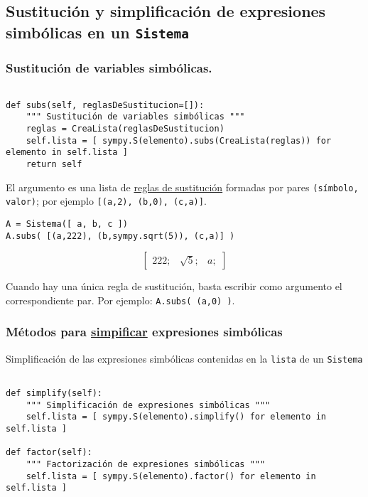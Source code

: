 \documentclass[11pt]{report}
\begin{document}
\subsection{Sustitución y simplificación de expresiones simbólicas en un \texttt{Sistema}}
\label{sec:orge5757f9}

\subsubsection{Sustitución de variables simbólicas.}
\label{sec:org74dfe5a}

\begin{verbatim}

def subs(self, reglasDeSustitucion=[]):
    """ Sustitución de variables simbólicas """
    reglas = CreaLista(reglasDeSustitucion)
    self.lista = [ sympy.S(elemento).subs(CreaLista(reglas)) for elemento in self.lista ]
    return self

\end{verbatim}

El argumento es una lista de \href{https://docs.sympy.org/latest/tutorials/intro-tutorial/basic\_operations.html}{reglas de sustitución} formadas por pares
\texttt{(símbolo, valor)}; por ejemplo \texttt{[(a,2), (b,0), (c,a)]}.

\begin{verbatim}
A = Sistema([ a, b, c ])
A.subs( [(a,222), (b,sympy.sqrt(5)), (c,a)] )
\end{verbatim}

$$\left[ \begin{array}{ccc}222;& \sqrt{5};& a;\end{array} \right]$$

Cuando hay una única regla de sustitución, basta escribir como
argumento el correspondiente par. Por ejemplo: \texttt{A.subs( (a,0) )}.

\subsubsection{Métodos para \href{https://docs.sympy.org/latest/tutorials/intro-tutorial/simplification.html}{simpificar} expresiones simbólicas}
\label{sec:orgceda43e}

Simplificación de las expresiones simbólicas contenidas en la \texttt{lista} de un \texttt{Sistema}

\begin{verbatim}

def simplify(self):
    """ Simplificación de expresiones simbólicas """
    self.lista = [ sympy.S(elemento).simplify() for elemento in self.lista ]
                                                               
def factor(self):
    """ Factorización de expresiones simbólicas """
    self.lista = [ sympy.S(elemento).factor() for elemento in self.lista ]

\end{verbatim}
\end{document}
